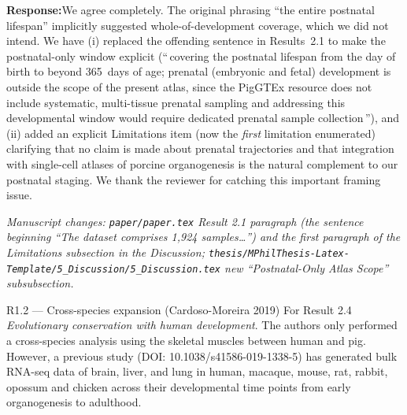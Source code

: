 \documentclass[11pt,a4paper]{article}
\newcommand{\response}[1]{%
  \par\vspace{2pt}\noindent\textbf{\textcolor{respcolor}{Response:}}\;\;#1\par\vspace{6pt}}
\newcommand{\changeloc}[1]{\par\noindent\textit{\small Manuscript changes: #1}\par}
\begin{document}
\response{We agree completely. The original phrasing ``the entire postnatal
lifespan'' implicitly suggested whole-of-development coverage, which we did
not intend. We have (i) replaced the offending sentence in Results~2.1 to
make the postnatal-only window explicit (``\,covering the postnatal lifespan
from the day of birth to beyond 365~days of age; prenatal (embryonic and
fetal) development is outside the scope of the present atlas, since the
PigGTEx resource does not include systematic, multi-tissue prenatal sampling
and addressing this developmental window would require dedicated prenatal
sample collection\,''), and (ii) added an explicit Limitations item (now the
\emph{first} limitation enumerated) clarifying that no claim is made about
prenatal trajectories and that integration with single-cell atlases of
porcine organogenesis is the natural complement to our postnatal staging.
We thank the reviewer for catching this important framing issue.}
\changeloc{\texttt{paper/paper.tex} Result 2.1 paragraph (the sentence
beginning ``The dataset comprises 1{,}924 samples\dots'') and the first
paragraph of the Limitations subsection in the Discussion;
\texttt{thesis/MPhilThesis-Latex-Template/5\_Discussion/5\_Discussion.tex}
new ``Postnatal-Only Atlas Scope'' subsubsection.}

\begin{reviewerbox}{R1.2 — Cross-species expansion (Cardoso-Moreira 2019)}
For Result 2.4 \emph{Evolutionary conservation with human development}. The
authors only performed a cross-species analysis using the skeletal muscles
between human and pig. However, a previous study
(DOI: 10.1038/s41586-019-1338-5) has generated bulk RNA-seq data of brain,
liver, and lung in human, macaque, mouse, rat, rabbit, opossum and chicken
across their developmental time points from early organogenesis to adulthood.
\end{reviewerbox}
\end{document}
